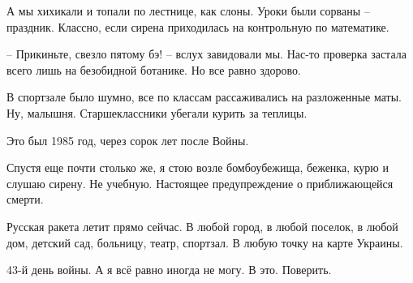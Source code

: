 А мы хихикали и топали по лестнице, как слоны. Уроки были сорваны – праздник.
Классно, если сирена приходилась на контрольную по математике. 

– Прикиньте, свезло пятому бэ! – вслух завидовали мы. Нас-то проверка застала
всего лишь на безобидной ботанике. Но все равно здорово.  

В спортзале было шумно, все по классам рассаживались на разложенные маты. Ну,
малышня. Старшеклассники убегали курить за теплицы. 

Это был 1985 год, через сорок лет после Войны. 

Спустя еще почти столько же, я стою возле бомбоубежища, беженка, курю и слушаю
сирену. Не учебную. Настоящее предупреждение о приближающейся смерти. 

Русская ракета летит прямо сейчас.  В любой город, в любой поселок, в любой
дом,  детский сад,  больницу,  театр, спортзал. В любую точку на карте Украины. 

43-й день войны. А я всё равно иногда не могу. В это. Поверить.

